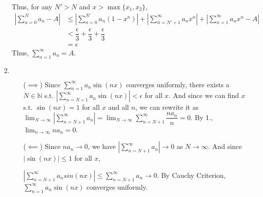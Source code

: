 \documentclass[12pt]{article}
\begin{document}
\begin{enumerate}
    Thus, for any $N' > N$ and $x > \max\{ x_1, x_2\}$,
    \begin{align*}
        |\sum_{n=0}^{N} a_n - A| &\leq |\sum_{n=0}^{N'} a_n(1-x^n)| + |\sum_{n=N'+1}^{\infty} a_n x^n | + |\sum_{n=1}^{\infty} a_nx^n - A|\\
        &< \dfrac{\epsilon}{3} + \dfrac{\epsilon}{3} + \dfrac{\epsilon}{3}\\
        &= \epsilon
    \end{align*}
    Thus, $\displaystyle\sum_{n=1}^{\infty} a_n = A$.

    \item $\ $\begin{enumerate}
        \item[($\implies$)] Since $\displaystyle\sum_{n=1}^{\infty} a_n \sin(nx)$ converges uniformly, 
        there exists a $N \in \mathbb{N}$ s.t. $|\displaystyle\sum_{n=N+1}^{\infty} a_n \sin(nx)| < \epsilon$ for all $x$.
        And since we can find $x$ s.t. $\sin(nx) = 1$ for all $x$ and all $n$, 
        we can rewrite it as $\displaystyle\lim_{N\to\infty}|\displaystyle\sum_{n=N+1}^{\infty} a_n| = \displaystyle\lim_{N\to\infty} \displaystyle\sum_{n=N+1}^{\infty} \dfrac{na_n}{n} = 0$.
        By 1., $\displaystyle\lim_{n\to\infty} na_n = 0$.

        \item[($\impliedby$)] Since $na_n \to 0$, we have         
        $\left|\displaystyle\sum_{n=N+1}^{\infty} a_n\right|\to 0$ as $N\to\infty$.
        And since $|\sin(nx)| \leq 1$ for all $x$,
        
        $\left|\displaystyle\sum_{n=N+1}^{\infty} a_n sin(nx)\right| \leq \displaystyle\sum_{n=N+1}^{\infty} a_n \to 0$.
        By Cauchy Criterion, $\displaystyle\sum_{n=1}^{\infty} a_n \sin(nx)$ converges uniformly.

    \end{enumerate}
\end{enumerate}
\end{document}
